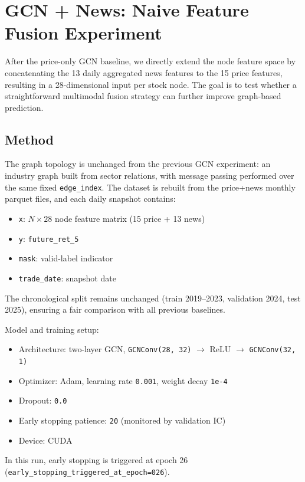 \section{GCN + News: Naive Feature Fusion Experiment}

After the price-only GCN baseline, we directly extend the node feature space by concatenating the 13 daily aggregated news features to the 15 price features, resulting in a 28-dimensional input per stock node. The goal is to test whether a straightforward multimodal fusion strategy can further improve graph-based prediction.

\subsection{Method}

The graph topology is unchanged from the previous GCN experiment: an industry graph built from sector relations, with message passing performed over the same fixed \texttt{edge\_index}. The dataset is rebuilt from the price+news monthly parquet files, and each daily snapshot contains:
\begin{itemize}
\item \texttt{x}: $N \times 28$ node feature matrix (15 price + 13 news)
\item \texttt{y}: \texttt{future\_ret\_5}
\item \texttt{mask}: valid-label indicator
\item \texttt{trade\_date}: snapshot date
\end{itemize}

The chronological split remains unchanged (train 2019--2023, validation 2024, test 2025), ensuring a fair comparison with all previous baselines.

Model and training setup:
\begin{itemize}
\item Architecture: two-layer GCN, \texttt{GCNConv(28, 32)} $\rightarrow$ ReLU $\rightarrow$ \texttt{GCNConv(32, 1)}
\item Optimizer: Adam, learning rate \texttt{0.001}, weight decay \texttt{1e-4}
\item Dropout: \texttt{0.0}
\item Early stopping patience: \texttt{20} (monitored by validation IC)
\item Device: CUDA
\end{itemize}

In this run, early stopping is triggered at epoch 26 (\texttt{early\_stopping\_triggered\_at\_epoch=026}).

